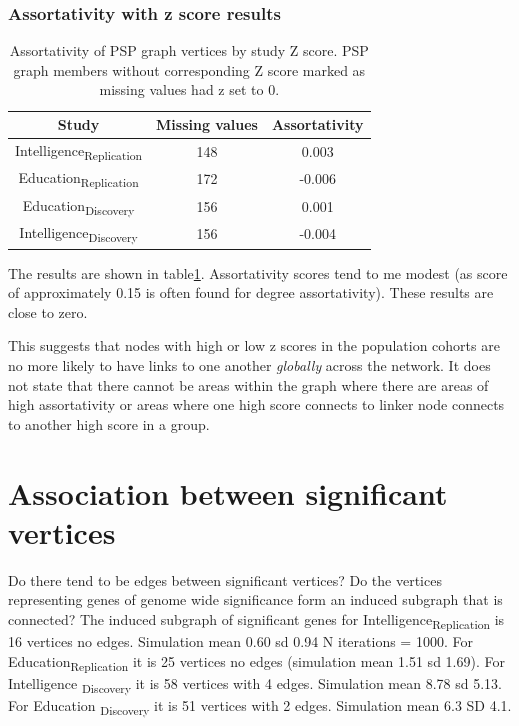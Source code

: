 \subsubsection{Assortativity with z score results}
 
 \begin{table}[]
     \centering
     \begin{tabular}{ccc}
     \toprule
         Study & Missing values  & Assortativity\\
         \midrule
         Intelligence\textsubscript{Replication} & 148 & 0.003\\
         Education\textsubscript{Replication} & 172 & -0.006\\
         Education\textsubscript{Discovery} & 156 & 0.001\\
         Intelligence\textsubscript{Discovery} & 156 & -0.004\\
         \bottomrule
     \end{tabular}
     \caption{Assortativity of PSP graph vertices by study Z score. PSP graph members without corresponding Z score marked as missing values had z set to 0.}
     \label{tab:Assortativity of PSP graph and z scores}
 \end{table}


The results are shown in table\ref{tab:Assortativity of PSP graph and z scores}. Assortativity scores tend to me modest (as score of approximately 0.15 is often found for degree assortativity). These results are close to zero. 

This suggests that nodes with high or low z scores in the population cohorts are no more likely to have links to one another \textit{globally} across the network. It does not state that there cannot be areas within the graph where there are areas of high assortativity or areas where one high score connects to linker node connects to another high score in a group.

\section{Association between significant vertices}
Do there tend to be edges between significant vertices? Do the vertices representing genes of genome wide significance form an induced subgraph that is connected?
The induced subgraph  of significant genes for Intelligence\textsubscript{Replication} is 16 vertices no edges. Simulation mean 0.60 sd 0.94 N iterations = 1000. For Education\textsubscript{Replication} it is 25 vertices no edges (simulation mean 1.51 sd 1.69). For Intelligence \textsubscript{Discovery} it is 58 vertices with 4 edges. Simulation mean 8.78 sd 5.13. For Education \textsubscript{Discovery} it is 51 vertices with 2 edges. Simulation mean 6.3 SD 4.1.

